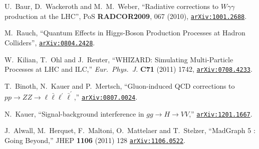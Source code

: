 \documentclass[english,12pt]{article}
\begin{document}
\begin{thebibliography}{10}
  U.~Baur, D.~Wackeroth and M.~M.~Weber,
  ``{Radiative corrections to $W \gamma \gamma$ production at the LHC}'',
  PoS {\bf RADCOR2009}, 067 (2010),
\href{http://www.arXiv.org/abs/1001.2688}{{\tt arXiv:1001.2688}}.

  M.~Rauch,
  ``Quantum Effects in Higgs-Boson Production Processes at Hadron Colliders'',
 \href{http://arxiv.org/abs/0804.2428}{{\tt arXiv:0804.2428}}.

  W.~Kilian, T.~Ohl and J.~Reuter,
  ``WHIZARD: Simulating Multi-Particle Processes at LHC and ILC,''
  {\em Eur.\ Phys.\ J.} {\bf C71} (2011) 1742,
 \href{http://arxiv.org/abs/0708.4233}{{\tt arXiv:0708.4233}}.

  T.~Binoth, N.~Kauer and P.~Mertsch,
  ``Gluon-induced QCD corrections to $pp \rightarrow ZZ \rightarrow \ell \bar{\ell} \ell^{'} \bar{\ell}^{'}$,''
  \href{http://arXiv.org/abs/0807.0024}{{\tt arXiv:0807.0024}}.
  
  N.~Kauer,
  ``Signal-background interference in $gg \rightarrow H \rightarrow VV$,''
  \href{http://arXiv.org/abs/1201.1667} {{\tt arXiv:1201.1667}}.

  J.~Alwall, M.~Herquet, F.~Maltoni, O.~Mattelaer and T.~Stelzer,
  ``MadGraph 5 : Going Beyond,''
  JHEP {\bf 1106} (2011) 128
  \href{http://arXiv.org/abs/1106.0522}{\tt arXiv:1106.0522}.

\end{thebibliography}\endgroup
\end{document}
